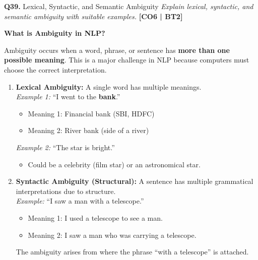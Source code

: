 \documentclass[12pt,a4paper]{article}
\newcommand{\Qno}[1]{\textbf{\color{darkred}Q#1.}}
\newcommand{\term}[1]{\textbf{\color{headingcolor}#1}}
\begin{document}
\vspace{8pt}

\begin{questionbox}{\Qno{39} Lexical, Syntactic, and Semantic Ambiguity}
\textit{Explain lexical, syntactic, and semantic ambiguity with suitable examples.} \hfill \textbf{[CO6 | BT2]}
\end{questionbox}

\begin{answerenv}

\textbf{\color{headingcolor}What is Ambiguity in NLP?}

Ambiguity occurs when a word, phrase, or sentence has \textbf{more than one possible meaning}. This is a major challenge in NLP because computers must choose the correct interpretation.

\vspace{6pt}
\begin{enumerate}[leftmargin=1.8em, itemsep=8pt]
  \item \term{Lexical Ambiguity:} A single word has multiple meanings.\\
  \textit{Example 1:} ``I went to the \textbf{bank}.''
  \begin{itemize}[leftmargin=1.5em]
    \item Meaning 1: Financial bank (SBI, HDFC)
    \item Meaning 2: River bank (side of a river)
  \end{itemize}
  \textit{Example 2:} ``The star is bright.''
  \begin{itemize}[leftmargin=1.5em]
    \item Could be a celebrity (film star) or an astronomical star.
  \end{itemize}

  \item \term{Syntactic Ambiguity (Structural):} A sentence has multiple grammatical interpretations due to structure.\\
  \textit{Example:} ``I saw a man with a telescope.''
  \begin{itemize}[leftmargin=1.5em]
    \item Meaning 1: I used a telescope to see a man.
    \item Meaning 2: I saw a man who was carrying a telescope.
  \end{itemize}
  The ambiguity arises from where the phrase ``with a telescope'' is attached.


\end{enumerate}
\end{answerenv}
\end{document}
